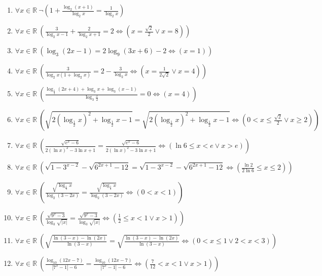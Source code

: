 \documentclass[11pt,a4paper]{article}
\begin{document}
\begin{enumerate}
\item $\displaystyle \forall x \in \mathbb{R}\ \lnot \left( 1 + \frac{\log_{2}(x + 1)}{\log_{2} x} = \frac{1}{\log_{2} x} \right)$
\item $\displaystyle \forall x \in \mathbb{R}\ \left( \frac{3}{\log_{2} x - 1} + \frac{2}{\log_{2} x + 1} = 2 \iff \left( x = \frac{\sqrt{2}}{2} \lor x = 8 \right) \right)$
\item $\displaystyle \forall x \in \mathbb{R}\ \left( \log_{3}(2x - 1) = 2\log_{9}(3x + 6) - 2 \iff \left( x = 1 \right) \right)$
\item $\displaystyle \forall x \in \mathbb{R}\ \left( \frac{3}{\log_{2} x(1 + \log_{2} x)} = 2 - \frac{3}{\log_{2} x} \iff \left( x = \frac{1}{2\sqrt{2}} \lor x = 4 \right) \right)$
\item $\displaystyle \forall x \in \mathbb{R}\ \left( \frac{\log_{\frac{1}{3}}(2x + 4) + \log_{3} x + \log_{3}(x - 1)}{\log_{3}\frac{x}{2}} = 0 \iff \left( x = 4 \right) \right)$
\item $\displaystyle \forall x \in \mathbb{R}\ \left( \sqrt{2\left(\log_{\frac{1}{2}} x\right)^{2} + \log_{\frac{1}{2}} x - 1} = \sqrt{2\left(\log_{\frac{1}{2}} x\right)^{2} + \log_{\frac{1}{2}} x - 1} \iff \left( 0 < x \le \frac{\sqrt{2}}{2} \lor x \ge 2 \right) \right)$
\item $\displaystyle \forall x \in \mathbb{R}\ \left( \frac{\sqrt{e^{x} - 6}}{2\left(\ln x\right)^{2} - 3\ln x + 1} = \frac{\sqrt{e^{x} - 6}}{2\left(\ln x\right)^{2} - 3\ln x + 1} \iff \left( \ln 6 \le x < e \lor x > e \right) \right)$
\item $\displaystyle \forall x \in \mathbb{R}\ \left( \sqrt{1 - 3^{x-2}} - \sqrt{6^{2x+1} - 12} = \sqrt{1 - 3^{x-2}} - \sqrt{6^{2x+1} - 12} \iff \left( \frac{\ln 2}{2\ln 6} \le x \le 2 \right) \right)$
\item $\displaystyle \forall x \in \mathbb{R}\ \left( \frac{\sqrt{\log_{\frac{1}{3}} x}}{\log_{2}(3 - 2x)} = \frac{\sqrt{\log_{\frac{1}{3}} x}}{\log_{2}(3 - 2x)} \iff \left( 0 < x < 1 \right) \right)$
\item $\displaystyle \forall x \in \mathbb{R}\ \left( \frac{\sqrt{9^{x} - 3}}{\log_{3}\sqrt{\left| x \right|}} = \frac{\sqrt{9^{x} - 3}}{\log_{3}\sqrt{\left| x \right|}} \iff \left( \frac{1}{2} \le x < 1 \lor x > 1 \right) \right)$
\item $\displaystyle \forall x \in \mathbb{R}\ \left( \sqrt{\frac{\ln(3 - x) - \ln(2x)}{\ln(3 - x)}} = \sqrt{\frac{\ln(3 - x) - \ln(2x)}{\ln(3 - x)}} \iff \left( 0 < x \le 1 \lor 2 < x < 3 \right) \right)$
\item $\displaystyle \forall x \in \mathbb{R}\ \left( \frac{\log_{10}(12x - 7)}{\left| 7^{x} - 1 \right| - 6} = \frac{\log_{10}(12x - 7)}{\left| 7^{x} - 1 \right| - 6} \iff \left( \frac{7}{12} < x < 1 \lor x > 1 \right) \right)$

\end{enumerate}
\end{document}
